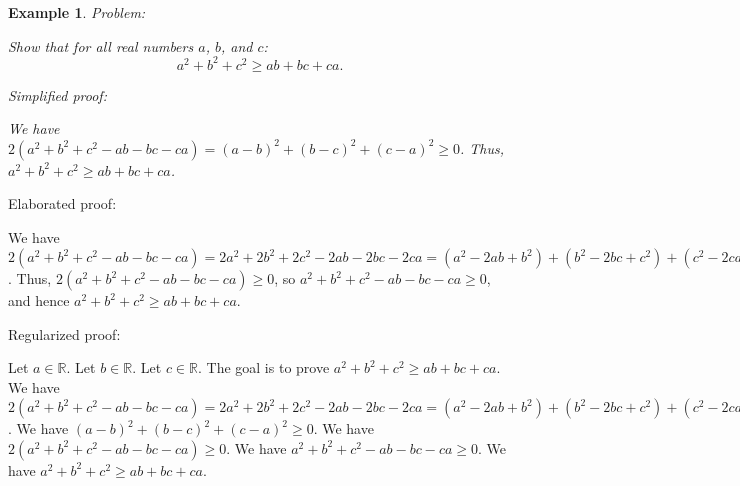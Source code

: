 \documentclass{article}
\newtheorem{example}{Example}
\begin{document}
\begin{example}
Problem:
\begin{tcolorbox}[colback=yellow!10, width=\linewidth]
Show that for all real numbers $a$, $b$, and $c$:
    $$a^2 + b^2 + c^2 \geq ab + bc + ca.$$
\end{tcolorbox}

Simplified proof:
\begin{tcolorbox}[colback=blue!10, width=\linewidth]
We have $2(a^2 + b^2 + c^2 - ab - bc - ca) = (a-b)^2 + (b-c)^2 + (c-a)^2 \ge 0$. Thus, $a^2 + b^2 + c^2 \geq ab + bc + ca$.
\end{tcolorbox}
\end{example}

Elaborated proof:
\begin{tcolorbox}[colback=green!10, width=\linewidth]
We have $2(a^2 + b^2 + c^2 - ab - bc - ca) = 2a^2 + 2b^2 + 2c^2 - 2ab - 2bc - 2ca = (a^2 - 2ab + b^2) + (b^2 - 2bc + c^2) + (c^2 - 2ca + a^2) = (a-b)^2 + (b-c)^2 + (c-a)^2 \ge 0$. Thus, $2(a^2 + b^2 + c^2 - ab - bc - ca) \ge 0$, so $a^2 + b^2 + c^2 - ab - bc - ca \ge 0$, and hence $a^2 + b^2 + c^2 \geq ab + bc + ca$.
\end{tcolorbox}

Regularized proof:
\begin{tcolorbox}[colback=red!10, width=\linewidth]
Let $a\in\mathbb{R}$.
Let $b\in\mathbb{R}$.
Let $c\in\mathbb{R}$.
The goal is to prove $a^2 + b^2 + c^2 \geq ab + bc + ca$.
We have $2(a^2 + b^2 + c^2 - ab - bc - ca) = 2a^2 + 2b^2 + 2c^2 - 2ab - 2bc - 2ca = (a^2 - 2ab + b^2) + (b^2 - 2bc + c^2) + (c^2 - 2ca + a^2) = {(a-b)}^2 + {(b-c)}^2 + {(c-a)}^2$.
We have ${(a-b)}^2 + {(b-c)}^2 + {(c-a)}^2 \ge 0$.
We have $2(a^2 + b^2 + c^2 - ab - bc - ca) \ge 0$.
We have $a^2 + b^2 + c^2 - ab - bc - ca \ge 0$.
We have $a^2 + b^2 + c^2 \geq ab + bc + ca$.
\end{tcolorbox}
\end{document}
